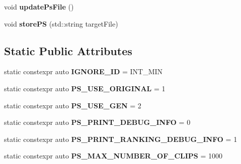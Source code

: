 \begin{DoxyCompactItemize}
\item 
\hypertarget{classkukadu_1_1ProjectiveSimulator_ae65467c2fdeebf45195a339d4546be9a}{void {\bfseries update\-Ps\-File} ()}\label{classkukadu_1_1ProjectiveSimulator_ae65467c2fdeebf45195a339d4546be9a}

\item 
\hypertarget{classkukadu_1_1ProjectiveSimulator_ac488f5b98aeafa9704a2a1cbff78d433}{void {\bfseries store\-P\-S} (std\-::string target\-File)}\label{classkukadu_1_1ProjectiveSimulator_ac488f5b98aeafa9704a2a1cbff78d433}

\end{DoxyCompactItemize}
\subsection*{Static Public Attributes}
\begin{DoxyCompactItemize}
\item 
\hypertarget{classkukadu_1_1ProjectiveSimulator_aca61d0fef4c6b66880d901dee5d013e1}{static constexpr auto {\bfseries I\-G\-N\-O\-R\-E\-\_\-\-I\-D} = I\-N\-T\-\_\-\-M\-I\-N}\label{classkukadu_1_1ProjectiveSimulator_aca61d0fef4c6b66880d901dee5d013e1}

\item 
\hypertarget{classkukadu_1_1ProjectiveSimulator_a34d27d64db9a7784f2a1e6bb384fbebf}{static constexpr auto {\bfseries P\-S\-\_\-\-U\-S\-E\-\_\-\-O\-R\-I\-G\-I\-N\-A\-L} = 1}\label{classkukadu_1_1ProjectiveSimulator_a34d27d64db9a7784f2a1e6bb384fbebf}

\item 
\hypertarget{classkukadu_1_1ProjectiveSimulator_aa3c0938e8baabba18467af36f47f4e59}{static constexpr auto {\bfseries P\-S\-\_\-\-U\-S\-E\-\_\-\-G\-E\-N} = 2}\label{classkukadu_1_1ProjectiveSimulator_aa3c0938e8baabba18467af36f47f4e59}

\item 
\hypertarget{classkukadu_1_1ProjectiveSimulator_a8cb8845bbc8f20498f708fac575d7d79}{static constexpr auto {\bfseries P\-S\-\_\-\-P\-R\-I\-N\-T\-\_\-\-D\-E\-B\-U\-G\-\_\-\-I\-N\-F\-O} = 0}\label{classkukadu_1_1ProjectiveSimulator_a8cb8845bbc8f20498f708fac575d7d79}

\item 
\hypertarget{classkukadu_1_1ProjectiveSimulator_a451e306dd5587b68fcd90a9e43dac576}{static constexpr auto {\bfseries P\-S\-\_\-\-P\-R\-I\-N\-T\-\_\-\-R\-A\-N\-K\-I\-N\-G\-\_\-\-D\-E\-B\-U\-G\-\_\-\-I\-N\-F\-O} = 1}\label{classkukadu_1_1ProjectiveSimulator_a451e306dd5587b68fcd90a9e43dac576}

\item 
\hypertarget{classkukadu_1_1ProjectiveSimulator_ad21dc772fd571626d7fad31ff251e0a5}{static constexpr auto {\bfseries P\-S\-\_\-\-M\-A\-X\-\_\-\-N\-U\-M\-B\-E\-R\-\_\-\-O\-F\-\_\-\-C\-L\-I\-P\-S} = 1000}\label{classkukadu_1_1ProjectiveSimulator_ad21dc772fd571626d7fad31ff251e0a5}

\end{DoxyCompactItemize}



